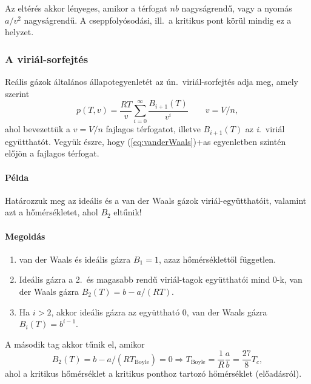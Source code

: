 \documentclass[12pt,a4paper]{scrartcl}
\begin{document}
Az eltérés akkor lényeges, amikor a térfogat $nb$ nagyságrendű, vagy a nyomás $a/v^2$ nagyságrendű. A cseppfolyósodási, ill.\ a kritikus pont körül mindig ez a helyzet.

\subsubsection{A viriál-sorfejtés}
Reális gázok általános állapotegyenletét az ún.\ viriál-sorfejtés adja meg, amely szerint
\begin{equation} \label{eq:virial}
p\left( {T,v} \right) = \frac{{RT}}{v}\sum\limits_{i = 0}^\infty  {\frac{{{B_{i + 1}}\left( T \right)}}{{{v^i}}}} \quad \quad v = V/n,
\end{equation}
ahol bevezettük a $v = V/n$ fajlagos térfogatot, illetve ${B_{i + 1}}\left( T \right)$ az \textit{i}.\ viriál együtthatót. Vegyük észre, hogy \atold(\ref{eq:vanderWaals})+as{} egyenletben szintén előjön a fajlagos térfogat.

\paragraph{Példa} Határozzuk meg az ideális és a van der Waals gázok viriál-együtthatóit, valamint azt a hőmérsékletet, ahol $B_2$ eltűnik!
\paragraph{Megoldás}
\begin{enumerate}
\item van der Waals és ideális gázra $B_1 = 1$, azaz hőmérséklettől független.
\item Ideális gázra a 2.\ és magasabb rendű viriál-tagok együtthatói mind 0-k, van der Waals gázra ${B_2}\left( T \right) = b - a/\left( {RT} \right)$.
\item Ha $i>2$, akkor ideális gázra az együttható 0, van der Waals gázra ${B_i}\left( T \right) = {b^{i - 1}}$.
\end{enumerate}
A második tag akkor tűnik el, amikor
\[{B_2}\left( T \right) = b - a/\left( {R{T_{{\text{Boyle}}}}} \right) = 0 \Rightarrow {T_{{\text{Boyle}}}} = \frac{1}{R}\frac{a}{b} = \frac{{27}}{8}{T_c},\]
ahol a kritikus hőmérséklet a kritikus ponthoz tartozó hőmérséklet (előadásról).
\end{document}
